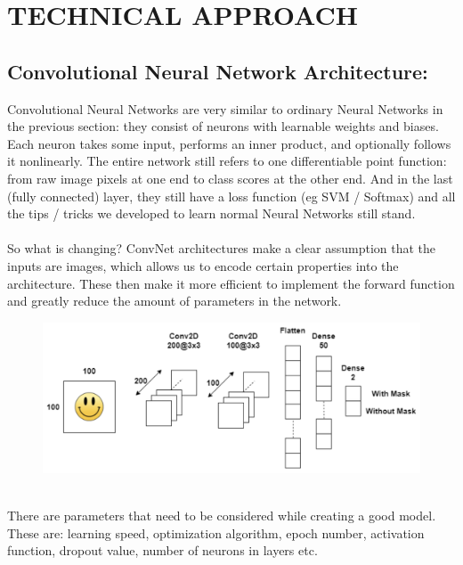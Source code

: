 \documentclass[a4paper, 12pt]{article}
\begin{document}
\section{TECHNICAL APPROACH}
\subsection{Convolutional Neural Network Architecture:}
Convolutional Neural Networks are very similar to ordinary Neural Networks in the previous section: they consist of neurons with learnable weights and biases. Each neuron takes some input, performs an inner product, and optionally follows it nonlinearly. The entire network still refers to one differentiable point function: from raw image pixels at one end to class scores at the other end. And in the last (fully connected) layer, they still have a loss function (eg SVM / Softmax) and all the tips / tricks we developed to learn normal Neural Networks still stand.\\ \\
So what is changing? ConvNet architectures make a clear assumption that the inputs are images, which allows us to encode certain properties into the architecture. These then make it more efficient to implement the forward function and greatly reduce the amount of parameters in the network.
\begin{figure}[h]
\includegraphics[scale=.43]{2.png}
\centering
\end{figure}
\\
There are parameters that need to be considered while creating a good model.  These are: learning speed, optimization algorithm, epoch number, activation function, dropout value, number of neurons in layers etc.
\end{document}
